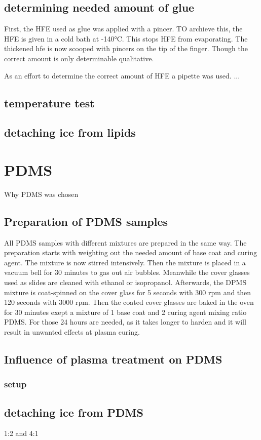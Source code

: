 \subsection{determining needed amount of glue}

First, the HFE used as glue was applied with a pincer. TO archieve this, the HFE is given in a cold bath at -140°C. This stops HFE from evaporating. The thickened hfe is now scooped with pincers on the tip of the finger. Though the correct amount is only determinable qualitative.

As an effort to determine the correct amount of HFE a pipette was used. ...



\subsection{temperature test}

\subsection{detaching ice from lipids}

\section{PDMS}

Why PDMS was chosen

\subsection{Preparation of PDMS samples}

All PDMS samples with different mixtures are prepared in the same way. The preparation starts with weighting out the needed amount of base coat and curing agent. The mixture is now stirred intensively. Then the mixture is placed in a vacuum bell for 30 minutes to gas out air bubbles. Meanwhile the cover glasses used as slides are cleaned with ethanol or isopropanol. Afterwards, the DPMS mixture is coat-spinned on the cover glass for 5 seconds with 300 rpm and then 120 seconds with 3000 rpm. Then the coated cover glasses are baked in the oven for 30 minutes exept a mixture of 1 base coat and 2 curing agent mixing ratio PDMS. For those 24 hours are needed, as it takes longer to harden and it will result in unwanted effects at plasma curing.

\subsection{Influence of plasma treatment on PDMS}

\subsubsection{setup}

\subsection{detaching ice from PDMS}

1:2 and 4:1

